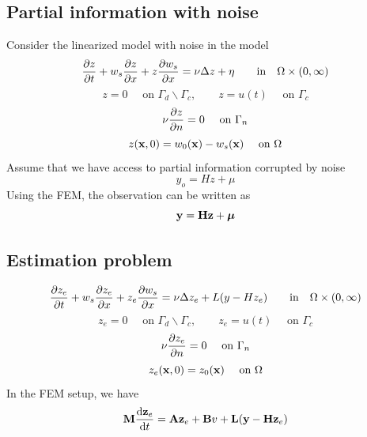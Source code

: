\documentclass[12pt]{article}
\begin{document}
\subsection{Partial information with noise}
Consider the linearized model with noise in the model
\begin{equation*}
\frac{\partial z}{\partial t} + w_s \frac{\partial z}{\partial x} + z \frac{\partial w_s}{\partial x} = \nu \Delta z + \eta \qquad \mbox{in} \quad \Omega \times (0,\infty)
\end{equation*}
\begin{equation*}
z = 0 \quad \text{ on } \Gamma_d \backslash \Gamma_c, \qquad z = u(t) \quad \text{ on } \Gamma_c
\end{equation*}
\begin{equation*}
\nu \frac{\partial z}{\partial n} = 0 \quad \text{ on } \Gamma_n
\end{equation*}
\begin{equation*}
z({\mathbf x},0) = w_0({\mathbf x}) - w_s({\mathbf x}) \quad \text{ on } \Omega
\end{equation*}
Assume that we have access to partial information corrupted by noise
\[
y_o = Hz + \mu
\]
Using the FEM, the observation can be written as
\[
{\mathbf y} = {\mathbf H} {\mathbf z} + \boldsymbol\mu
\]


\subsection{Estimation problem}
\begin{equation*}
\frac{\partial z_e}{\partial t} + w_s \frac{\partial z_e}{\partial x} + z_e \frac{\partial w_s}{\partial x} = \nu \Delta z_e +  L( y - H z_e ) \qquad \mbox{in} \quad \Omega \times (0,\infty)
\end{equation*}
\begin{equation*}
z_e = 0 \quad \text{ on } \Gamma_d \backslash \Gamma_c, \qquad z_e = u(t) \quad \text{ on } \Gamma_c
\end{equation*}
\begin{equation*}
\nu \frac{\partial z_e}{\partial n} = 0 \quad \text{ on } \Gamma_n
\end{equation*}
\begin{equation*}
z_e({\mathbf x},0) = z_0({\mathbf x}) \quad \text{ on } \Omega
\end{equation*} 
In the FEM setup, we have
\[
{\mathbf M} \frac{\textrm{d} {\mathbf z}_e}{\textrm{d} t} = {\mathbf A} {\mathbf z}_e + {\mathbf B} v + {\mathbf L}({\mathbf y} - {\mathbf H} {\mathbf z}_e)
\]

\end{document}
